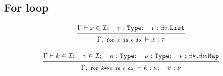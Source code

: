 \subsection{For loop}

\[
	\infrule{
		\EnvSym\then x \in \Id \semiq \tau:\Type \semiq \expr:\exists\tau.\List
	}{
		\EnvSym, \code{for $x$ in $\expr$ do} \then x:\tau
	}
\]

\[
	\infrule{
		\EnvSym\then k \in \Id \semiq v \in \Id \semiq \kappa:\Type \semiq \nu:\Type \semiq \expr:\exists\kappa.\exists\nu.\Map
	}{
		\EnvSym, \code{for $k$=>$v$ in $\expr$ do} \then k:\kappa \semiq v:\nu
	}
\]


